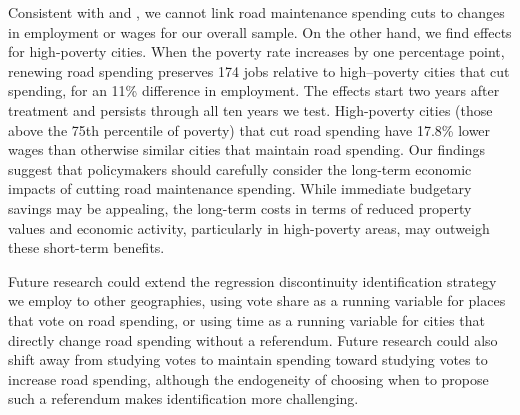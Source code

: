 Consistent with \cite{dalenberg1995effects} and \cite{gibbons2019new}, we cannot link road maintenance spending cuts to changes in employment or wages for our overall sample.  On the other hand, we find effects for high-poverty cities.  When the poverty rate increases by one percentage point, renewing road spending preserves 174 jobs relative to high–poverty cities that cut spending, for an 11\% difference in employment.  The effects start two years after treatment and persists through all ten years we test.  High-poverty cities (those above the 75th percentile of poverty) that cut road spending have 17.8\% lower wages than otherwise similar cities that maintain road spending. Our findings suggest that policymakers should carefully consider the long-term economic impacts of cutting road maintenance spending. While immediate budgetary savings may be appealing, the long-term costs in terms of reduced property values and economic activity, particularly in high-poverty areas, may outweigh these short-term benefits. 

 Future research could extend the regression discontinuity identification strategy we employ to other geographies, using vote share as a running variable for places that vote on road spending, or using time as a running variable for cities that directly change road spending without a referendum. Future research could also shift away from studying votes to maintain spending toward studying votes to increase road spending, although the endogeneity of choosing when to propose such a referendum makes identification more challenging.



